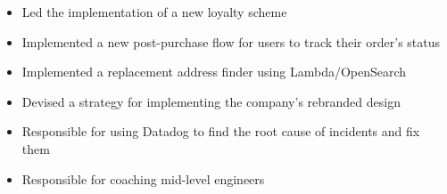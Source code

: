 \bigbreak
\begin{itemize}
    \item Led the implementation of a new loyalty scheme
    \item Implemented a new post-purchase flow for users to track their order's status
    \item Implemented a replacement address finder using Lambda/OpenSearch
    \item Devised a strategy for implementing the company's rebranded design
    \item Responsible for using Datadog to find the root cause of incidents and fix them
    \item Responsible for coaching mid-level engineers
\end{itemize}
